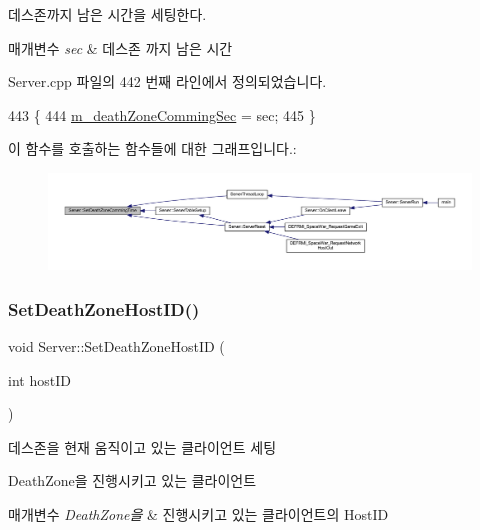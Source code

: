 데스존까지 남은 시간을 세팅한다.


\begin{DoxyParams}{매개변수}
{\em sec} & 데스존 까지 남은 시간 \\
\hline
\end{DoxyParams}


Server.\+cpp 파일의 442 번째 라인에서 정의되었습니다.


\begin{DoxyCode}
443 \{
444     \hyperlink{class_server_ac613fa786c19b3604dac2fd1619293c3}{m\_deathZoneCommingSec} = sec;
445 \}
\end{DoxyCode}
이 함수를 호출하는 함수들에 대한 그래프입니다.\+:\nopagebreak
\begin{figure}[H]
\begin{center}
\leavevmode
\includegraphics[width=350pt]{class_server_a0c817a017f9b2cb6f92de01e693b8e35_icgraph}
\end{center}
\end{figure}
\mbox{\label{class_server_a78cb51003b1a243780c2845263e75b29}} 
\subsubsection{\texorpdfstring{Set\+Death\+Zone\+Host\+I\+D()}{SetDeathZoneHostID()}}
{\footnotesize\ttfamily void Server\+::\+Set\+Death\+Zone\+Host\+ID (\begin{DoxyParamCaption}\item[{int}]{host\+ID }\end{DoxyParamCaption})}



데스존을 현재 움직이고 있는 클라이언트 세팅 

Death\+Zone을 진행시키고 있는 클라이언트


\begin{DoxyParams}{매개변수}
{\em Death\+Zone을} & 진행시키고 있는 클라이언트의 Host\+ID \\
\hline
\end{DoxyParams}


